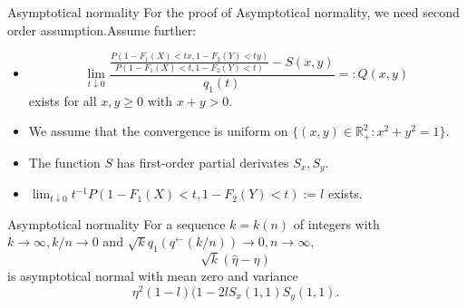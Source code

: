 \documentclass[11pt]{beamer}
\begin{document}
\begin{frame}{Asymptotical normality}
For the proof of Asymptotical normality, we need second order assumption.Assume further:
\begin{itemize}
\item
\begin{displaymath}
 \lim_{t\downarrow 0} \dfrac{ \frac{P(1-F_1(X)<tx, 1-F_2(Y)<ty)}{P(1-F_1(X)<t, 1-F_2(Y)<t)} -S(x,y)}{q_1(t)}=:Q(x,y)
\end{displaymath}
exists for all $x,y\ge 0$ with $x+y>0$.
\item We assume that the convergence is uniform on $\{ (x,y)\in \mathbb{R}_{+}^2:x^2+y^2=1\}$.
\item The function $S$ has first-order partial derivates $S_x,S_y$.
\item $\lim_{t\downarrow 0}  t^{-1}P(1-F_1(X)<t, 1-F_2(Y)<t):=l$ exists.
\end{itemize}
\end{frame}

\begin{frame}{Asymptotical normality}
For a sequence $k=k(n)$ of integers with $k\to \infty,k/n \to 0$ and $\sqrt{k}q_1(q^{\leftarrow}(k/n))\to 0, n\to \infty$,
\begin{displaymath}
\sqrt{k}(\hat{\eta}-\eta)
\end{displaymath}
is asymptotical normal with mean zero and variance
\begin{displaymath}
\eta^2(1-l)(1-2lS_x(1,1)S_y(1,1).
\end{displaymath}
\end{frame}
\end{document}
